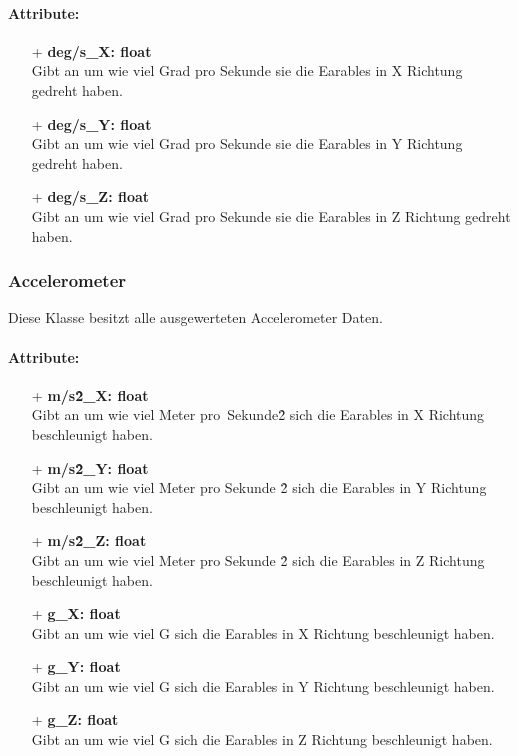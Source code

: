 \documentclass[a4paper,12pt]{article}
\begin{document}
\paragraph{Attribute:}
\begin{itemize}
	\item[+] \textbf{deg/s\_X: float}\\Gibt an um wie viel Grad pro Sekunde sie die Earables in X Richtung gedreht haben.
	\item[+] \textbf{deg/s\_Y: float}\\Gibt an um wie viel Grad pro Sekunde sie die Earables in Y Richtung gedreht haben.
	\item[+] \textbf{deg/s\_Z: float}\\Gibt an um wie viel Grad pro Sekunde sie die Earables in Z Richtung gedreht haben.
\end{itemize}


\subsubsection{Accelerometer}
Diese Klasse besitzt alle ausgewerteten Accelerometer Daten.

\paragraph{Attribute:}
\begin{itemize}
	\item[+] \textbf{m/s\^2\_X: float}\\Gibt an um wie viel Meter pro\ Sekunde\^2 sich die Earables in X Richtung beschleunigt haben.
	\item[+] \textbf{m/s\^2\_Y: float}\\Gibt an um wie viel Meter pro Sekunde \^2 sich die Earables in Y Richtung beschleunigt haben.
	\item[+] \textbf{m/s\^2\_Z: float}\\Gibt an um wie viel Meter pro Sekunde \^2 sich die Earables in Z Richtung beschleunigt haben.
	\item[+] \textbf{g\_X: float}\\Gibt an um wie viel G sich die Earables in X Richtung beschleunigt haben.
	\item[+] \textbf{g\_Y: float}\\Gibt an um wie viel G sich die Earables in Y Richtung beschleunigt haben.
	\item[+] \textbf{g\_Z: float}\\Gibt an um wie viel G sich die Earables in Z Richtung beschleunigt haben.
\end{itemize}
\end{document}

